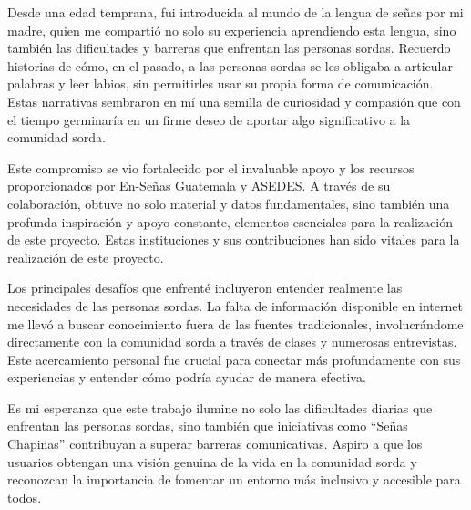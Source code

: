 Desde una edad temprana, fui introducida al mundo de la lengua de señas por mi madre, quien me compartió no solo su experiencia aprendiendo esta lengua, sino también las dificultades y barreras que enfrentan las personas sordas. Recuerdo historias de cómo, en el pasado, a las personas sordas se les obligaba a articular palabras y leer labios, sin permitirles usar su propia forma de comunicación. Estas narrativas sembraron en mí una semilla de curiosidad y compasión que con el tiempo germinaría en un firme deseo de aportar algo significativo a la comunidad sorda.

Este compromiso se vio fortalecido por el invaluable apoyo y los recursos proporcionados por En-Señas Guatemala y ASEDES. A través de su colaboración, obtuve no solo material y datos fundamentales, sino también una profunda inspiración y apoyo constante, elementos esenciales para la realización de este proyecto. Estas instituciones y sus contribuciones han sido vitales para la realización de este proyecto.

Los principales desafíos que enfrenté incluyeron entender realmente las necesidades de las personas sordas. La falta de información disponible en internet me llevó a buscar conocimiento fuera de las fuentes tradicionales, involucrándome directamente con la comunidad sorda a través de clases y numerosas entrevistas. Este acercamiento personal fue crucial para conectar más profundamente con sus experiencias y entender cómo podría ayudar de manera efectiva.

Es mi esperanza que este trabajo ilumine no solo las dificultades diarias que enfrentan las personas sordas, sino también que iniciativas como ``Señas Chapinas'' contribuyan a superar barreras comunicativas. Aspiro a que los usuarios obtengan una visión genuina de la vida en la comunidad sorda y reconozcan la importancia de fomentar un entorno más inclusivo y accesible para todos.

